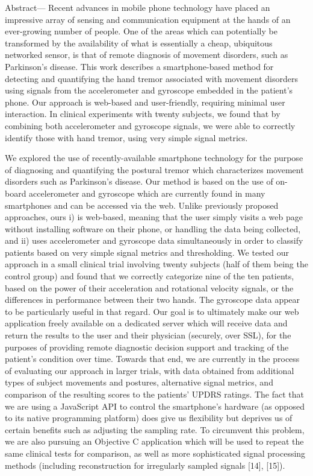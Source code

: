 Abstract— Recent advances in mobile phone technology have placed an impressive array of sensing and communication equipment at the hands of an ever-growing number of people. One of the areas which can potentially be transformed by the availability of what is essentially a cheap, ubiquitous networked sensor, is that of remote diagnosis of movement disorders, such as Parkinson’s disease. This work describes a smartphone-based method for detecting and quantifying the hand tremor associated with movement disorders using signals from the accelerometer and gyroscope embedded in the patient’s phone. Our approach is web-based and user-friendly, requiring minimal user interaction. In clinical experiments with twenty subjects, we found that by combining both accelerometer and gyroscope signals, we were able to correctly identify those with hand tremor, using very simple signal metrics. 

We explored the use of recently-available smartphone technology for the purpose of diagnosing and quantifying the postural tremor which characterizes movement disorders such as Parkinson’s disease. Our method is based on the use of on-board accelerometer and gyroscope which are currently found in many smartphones and can be accessed via the web. Unlike previously proposed approaches, ours i) is web-based, meaning that the user simply visits a web page without installing software on their phone, or handling the data being collected, and ii) uses accelerometer and gyroscope data simultaneously in order to classify patients based on very simple signal metrics and thresholding. 
We tested our approach in a small clinical trial involving twenty subjects (half of them being the control group) and found that we correctly categorize nine of the ten patients, based on the power of their acceleration and rotational velocity signals, or the differences in performance between their two hands. The gyroscope data appear to be particularly useful in that regard.
Our goal is to ultimately make our web application freely available on a dedicated server which will receive data and return the results to the user and their physician (securely, over SSL), for the purposes of providing remote diagnostic decision support and tracking of the patient’s condition over time. Towards that end, we are currently in the process of evaluating our approach in larger trials, with data obtained from additional types of subject movements and postures, alternative signal metrics, and comparison of the resulting scores to the patients’ UPDRS ratings. 
The fact that we are using a JavaScript API to control the smartphone’s hardware (as opposed to its native programming platform) does give us flexibility but deprives us of certain benefits such as adjusting the sampling rate. To circumvent this problem, we are also pursuing an Objective C application which will be used to repeat the same clinical tests for comparison, as well as more sophisticated signal processing methods (including reconstruction for irregularly sampled signals [14], [15]). 

